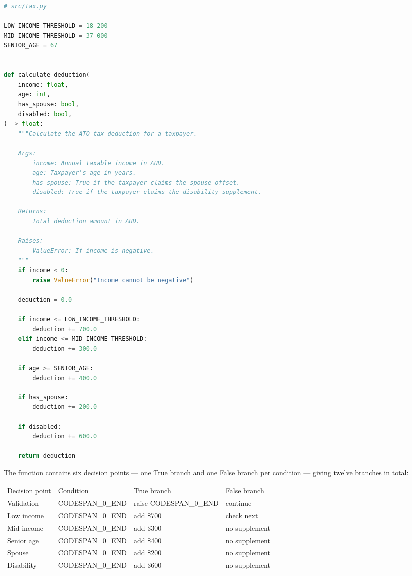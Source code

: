 \documentclass[11pt,a4paper]{book}
\begin{document}
\begin{lstlisting}[language=Python]
# src/tax.py

LOW_INCOME_THRESHOLD = 18_200
MID_INCOME_THRESHOLD = 37_000
SENIOR_AGE = 67


def calculate_deduction(
    income: float,
    age: int,
    has_spouse: bool,
    disabled: bool,
) -> float:
    """Calculate the ATO tax deduction for a taxpayer.

    Args:
        income: Annual taxable income in AUD.
        age: Taxpayer's age in years.
        has_spouse: True if the taxpayer claims the spouse offset.
        disabled: True if the taxpayer claims the disability supplement.

    Returns:
        Total deduction amount in AUD.

    Raises:
        ValueError: If income is negative.
    """
    if income < 0:
        raise ValueError("Income cannot be negative")

    deduction = 0.0

    if income <= LOW_INCOME_THRESHOLD:
        deduction += 700.0
    elif income <= MID_INCOME_THRESHOLD:
        deduction += 300.0

    if age >= SENIOR_AGE:
        deduction += 400.0

    if has_spouse:
        deduction += 200.0

    if disabled:
        deduction += 600.0

    return deduction
\end{lstlisting}

The function contains six decision points --- one True branch and one False branch per condition --- giving twelve branches in total:

\begin{tabular}{llll}
\hline
Decision point & Condition & True branch & False branch \\
Validation & CODESPAN\_0\_END & raise CODESPAN\_0\_END & continue \\
Low income & CODESPAN\_0\_END & add \$700 & check next \\
Mid income & CODESPAN\_0\_END & add \$300 & no supplement \\
Senior age & CODESPAN\_0\_END & add \$400 & no supplement \\
Spouse & CODESPAN\_0\_END & add \$200 & no supplement \\
Disability & CODESPAN\_0\_END & add \$600 & no supplement \\
\hline
\end{tabular}
\end{document}
